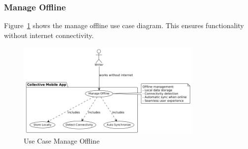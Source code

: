 \subsubsection{Manage Offline}

Figure~\ref{fig:usecase-manage-offline} shows the manage offline use case diagram. This ensures functionality without internet connectivity.

\begin{figure}[H]
\centering
\includegraphics[width=0.8\textwidth]{files/imgs/usecase_U9ojaa5Fma.png}
\caption{Use Case Manage Offline}
\label{fig:usecase-manage-offline}
\end{figure}

